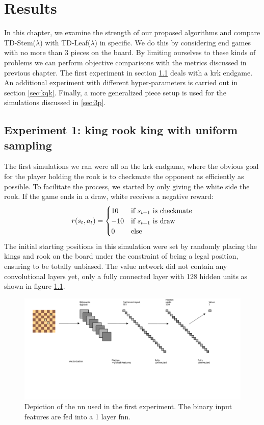 \chapter{Results}
\label{ch:res}

In this chapter, we examine the strength of our proposed algorithms and compare TD-Stem($\lambda$) with TD-Leaf($\lambda$) in specific. We do this by considering end games with no more than 3 pieces on the board. By limiting ourselves to these kinds of problems we can perform objective comparisons with the metrics discussed in previous chapter. The first experiment in section \ref{sec:krk} deals with a \gls{krk} endgame. An additional experiment with different hyper-parameters is carried out in section \ref{sec:kqk}. Finally, a more generalized piece setup is used for the simulations discussed in \ref{sec:3p}.

\section{Experiment 1: king rook king with uniform sampling}
\label{sec:krk}

The first simulations we ran were all on the \gls{krk} endgame, where the obvious goal for the player holding the rook is to checkmate the opponent as efficiently as possible. To facilitate the process, we started by only giving the white side the rook. If the game ends in a draw, white receives a negative reward:
\begin{equation*}
\label{eq:rexp1}
r(s_t,a_t) = \begin{cases} 
   10 & \text{if } s_{t+1} \textnormal{ is checkmate}\\
   -10 & \text{if } s_{t+1} \textnormal{ is draw} \\
   0 &  \textnormal{else}
  \end{cases}
\end{equation*}
The initial starting positions in this simulation were set by randomly placing the kings and rook on the board under the constraint of being a legal position, ensuring to be totally unbiased. The value network did not contain any convolutional layers yet, only a fully connected layer with 128 hidden units as shown in figure \ref{fig:fnn}.\\


\begin{figure}
\centering
\includegraphics[trim={0 6cm 0 0cm},clip,scale=0.5]{fig/arch/fc}
\caption[\gls{nn} used in the first experiment]{Depiction of the \gls{nn} used in the first experiment. The binary input features are fed into a 1 layer \gls{fnn}.}
\label{fig:fnn}
\end{figure}

